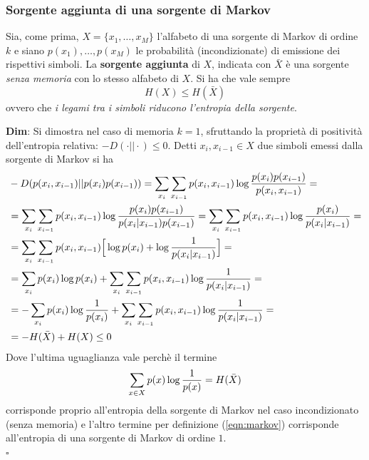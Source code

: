 \subsubsection{Sorgente aggiunta di una sorgente di Markov}
Sia, come prima, $X = \{x_1, \dots, x_M\}$ l'alfabeto di una sorgente di Markov di ordine $k$ e siano $p(x_1), \dots, p(x_M)$ le probabilit\`a (incondizionate) di emissione dei rispettivi simboli. La \textbf{sorgente aggiunta} di $X$, indicata con $\bar{X}$ \`e una sorgente \textit{senza memoria} con lo stesso alfabeto di $X$. Si ha che vale sempre
\begin{equation}
\label{eqn:adjoint}
    H(X) \leq H(\bar{X})
\end{equation}
ovvero che \textit{i legami tra i simboli riducono l'entropia della sorgente}.
\begin{tcolorbox}
\textbf{Dim}: Si dimostra nel caso di memoria $k=1$, sfruttando la propriet\`a di positivit\`a dell'entropia relativa: $-D(\cdot || \cdot) \leq 0$. Detti $x_i, x_{i-1} \in X$ due simboli emessi dalla sorgente di Markov si ha
\begin{align*}
    &-D(p(x_i,x_{i-1})||p(x_i)p(x_{i-1})) =\sum_{x_i} \sum_{x_{i-1}} p(x_i,x_{i-1}) \log \frac{p(x_i)p(x_{i-1})}{p(x_i,x_{i-1})} = \\
    &= \sum_{x_i} \sum_{x_{i-1}} p(x_i,x_{i-1}) \log \frac{p(x_i)p(x_{i-1})}{p(x_i|x_{i-1})p(x_{i-1})} = \sum_{x_i} \sum_{x_{i-1}} p(x_i,x_{i-1}) \log \frac{p(x_i)}{p(x_i|x_{i-1})} = \\
    &= \sum_{x_i} \sum_{x_{i-1}} p(x_i,x_{i-1}) \Big [ \log p(x_i) + \log \frac{1}{p(x_i|x_{i-1})}  \Big ] = \\
    &=\sum_{x_i} p(x_i) \log p(x_i) + \sum_{x_i} \sum_{x_{i-1}} p(x_i,x_{i-1}) \log \frac{1}{p(x_i|x_{i-1})} = \\ %
    &= -\sum_{x_i} p(x_i) \info{x_i} + \sum_{x_i} \sum_{x_{i-1}} p(x_i,x_{i-1}) \log \frac{1}{p(x_i|x_{i-1})} = \\
    &= -H(\bar{X}) + H(X) \leq 0
\end{align*}
Dove l'ultima uguaglianza vale perch\`e il termine 
\begin{equation*}
    \sum_{x \in X} p(x) \log \frac{1}{p({x})} = H(\bar{X})
\end{equation*}
corrisponde proprio all'entropia della sorgente di Markov nel caso incondizionato (senza memoria) e l'altro termine per definizione (\ref{eqn:markov}) corrisponde all'entropia di una sorgente di Markov di ordine $1$.\\
$\square$
\end{tcolorbox}
